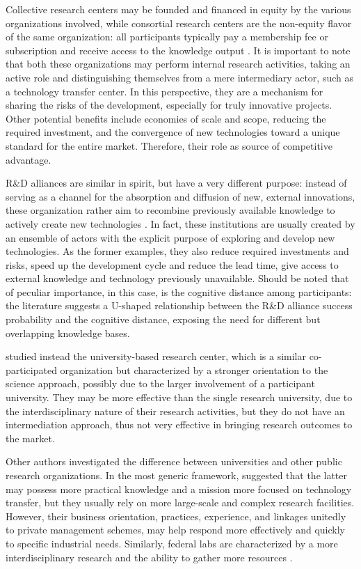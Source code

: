 Collective research centers may be founded and financed in equity by the various organizations involved, while consortial research centers are the non-equity flavor of the same organization: all participants typically pay a membership fee or subscription and receive access to the knowledge output \citep{Hayton2013}. It is important to note that both these organizations may perform internal research activities, taking an active role and distinguishing themselves from a mere intermediary actor, such as a technology transfer center. In this perspective, they are a mechanism for sharing the risks of the development, especially for truly innovative projects. Other potential benefits include economies of scale and scope, reducing the required investment, and the convergence of new technologies toward a unique standard for the entire market. Therefore, their role as source of competitive advantage.

R\&D alliances are similar in spirit, but have a very different purpose: instead of serving as a channel for the absorption and diffusion of new, external innovations, these organization rather aim to recombine previously available knowledge to actively create new technologies \citep{Lin2012}. In fact, these institutions are usually created by an ensemble of actors with the explicit purpose of exploring and develop new technologies. As the former examples, they also reduce required investments and risks, speed up the development cycle and reduce the lead time, give access to external knowledge and technology previously unavailable. Should be noted that of peculiar importance, in this case, is the cognitive distance among participants: the literature suggests a U-shaped relationship between the R\&D alliance success probability and the cognitive distance, exposing the need for different but overlapping knowledge bases.

\citet{Rogers2001} studied instead the university-based research center, which is a similar co-participated organization but characterized by a stronger orientation to the science approach, possibly due to the larger involvement of a participant university. They may be more effective than the single research university, due to the interdisciplinary nature of their research activities, but they do not have an intermediation approach, thus not very effective in bringing research outcomes to the market.

Other authors investigated the difference between universities and other public research organizations. In the most generic framework, \citet{Teirlinck2012} suggested that the latter may possess more practical knowledge and a mission more focused on technology transfer, but they usually rely on more large-scale and complex research facilities. However, their business orientation, practices, experience, and linkages \citep{Debackere2005} unitedly to private management schemes, may help respond more effectively and quickly to specific industrial needs. Similarly, federal labs are characterized by a more interdisciplinary research and the ability to gather more resources \citep{Bozeman2000}.

